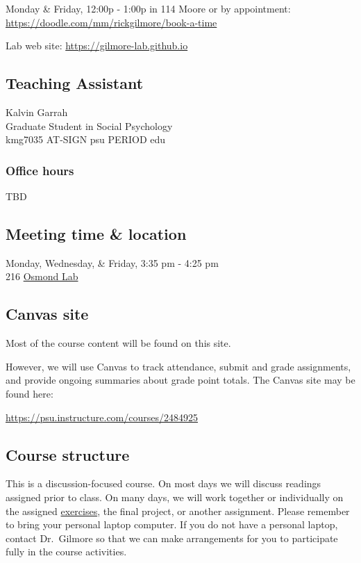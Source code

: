 \documentclass[
  letterpaper,
  DIV=11,
  numbers=noendperiod]{scrartcl}
\begin{document}
Monday \& Friday, 12:00p - 1:00p in 114 Moore or by appointment:
\url{https://doodle.com/mm/rickgilmore/book-a-time}

Lab web site: \url{https://gilmore-lab.github.io}

\subsection*{Teaching Assistant}\label{teaching-assistant}

Kalvin Garrah\\
Graduate Student in Social Psychology\\
kmg7035 AT-SIGN psu PERIOD edu\\

\subsubsection{Office hours}\label{office-hours-1}

TBD

\subsection*{Meeting time \& location}\label{meeting-time-location}

Monday, Wednesday, \& Friday, 3:35 pm - 4:25 pm\\
216
\href{https://map.psu.edu/?id=1134\#!ct/25403,26748,26749,26750,27255?m/274773?s/Osmond}{Osmond
Lab}

\subsection{Canvas site}\label{canvas-site}

Most of the course content will be found on this site.

However, we will use Canvas to track attendance, submit and grade
assignments, and provide ongoing summaries about grade point totals. The
Canvas site may be found here:

\url{https://psu.instructure.com/courses/2484925}

\subsection{Course structure}\label{course-structure}

This is a discussion-focused course. On most days we will discuss
readings assigned prior to class. On many days, we will work together or
individually on the assigned \href{index.qmd\#exercises}{exercises}, the
final project, or another assignment. Please remember to bring your
personal laptop computer. If you do not have a personal laptop, contact
Dr.~Gilmore so that we can make arrangements for you to participate
fully in the course activities.
\end{document}
